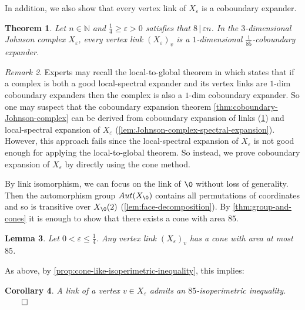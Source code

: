 \documentclass[10pt,a4paper]{article}
\newcommand{\prettyref}[1]{\cref{#1}}
\newtheorem{theorem}{Theorem}[section]
\newtheorem{lemma}[theorem]{Lemma}
\newtheorem{corollary}[theorem]{Corollary}
\theoremstyle{definition}
\theoremstyle{remark}
\newtheorem{remark}[theorem]{Remark}
\renewcommand{\leq}{\leqslant}
\renewcommand{\ge}{\geqslant}
\numberwithin{equation}{section}
\let\pref=\prettyref
\begin{document}
In addition, we also show that every vertex link of $X_\varepsilon$ is a coboundary expander.
\begin{theorem}\label{thm:coboundary-Johnson-link}
    Let $n\in\mathbb{N}$ and $\frac{1}{4}\ge\varepsilon > 0$ satisfies that $8\,|\,\varepsilon n$. In the $3$-dimensional Johnson complex $X_{\varepsilon}$, every vertex link $(X_{\varepsilon})_v$ is a $1$-dimensional $\frac{1}{85}$-coboundary expander.
\end{theorem}
\begin{remark}
    Experts may recall the local-to-global theorem in \cite{EvraK2016} which states that if a complex is both a good local-spectral expander and its vertex links are $1$-dim coboundary expanders then the complex is also a $1$-dim coboundary expander. So one may suspect that the coboundary expansion theorem \pref{thm:coboundary-Johnson-complex} can be derived from coboundary expansion of links (\pref{thm:coboundary-Johnson-link}) and local-spectral expansion of $X_\varepsilon$ (\pref{lem:Johnson-complex-spectral-expansion}). However, this approach fails since the local-spectral expansion of $X_\varepsilon$ is not good enough for applying the local-to-global theorem. So instead, we prove coboundary expansion of $X_\varepsilon$ by directly using the cone method.
\end{remark}

By link isomorphism, we can focus on the link of $\0$ without loss of generality. Then the automorphism group $Aut(X_\0)$ contains all permutations of coordinates and so is transitive over  $X_\0(2)$ (\pref{lem:face-decomposition}). By \pref{thm:group-and-cones} it is enough to show that there exists a cone with area $85$.
\begin{lemma} \label{lem:cone-for-link-X}
    Let \(0<\varepsilon \leq \frac{1}{4}\). Any vertex link \((X_{\varepsilon})_v\) has a cone with area at most \(85\).
\end{lemma}

As above, by \pref{prop:cone-like-isoperimetric-inequality}, this implies:
\begin{corollary} \label{cor:isoperimetric-inequality-link}
    A link of a vertex \(v \in X_\varepsilon\) admits an \(85\)-isoperimetric inequality. \(\qed\)
\end{corollary}

%
\end{document}
